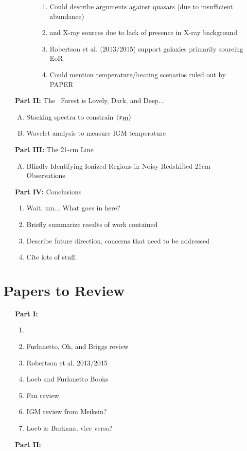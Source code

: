 \documentclass[11pt]{article}
\begin{document}
\begin{enumerate}
\begin{enumerate}[1.]
\begin{enumerate}[A.]
\begin{enumerate}[$\to$]
\item Could describe arguments against quasars (due to insufficient abundance) 
\item and X-ray sources due to lack of presence in X-ray background
\item Robertson et al. (2013/2015) support galaxies primarily sourcing EoR
\item Could mention temperature/heating scenarios ruled out by PAPER
\end{enumerate}
\end{enumerate}
\end{enumerate}




\item [{\bf Part II:}] The \lya\ Forest is Lovely, Dark, and Deep...
\begin{enumerate}[A.]
\item Stacking spectra to constrain $\langle x_{\text{HI}}\rangle$
\item Wavelet analysis to measure IGM temperature
\end{enumerate}
\item [{\bf Part III:}] The 21-cm Line
\begin{enumerate}[A.]
\item Blindly Identifying Ionized Regions in Noisy Redshifted 21cm Observations
\end{enumerate}
\item [{\bf Part IV:}] Conclusions
\begin{enumerate}[$\to$]
\item Wait, um... What goes in here?
\item Briefly summarize results of work contained 
\item Describe future direction, concerns that need to be addressed
\item Cite lots of stuff.
\end{enumerate}
\end{enumerate}






\section*{Papers to Review}
\begin{enumerate}
\item [{\bf Part I:}]
\begin{enumerate}[-]
\item 
\item Furlanetto, Oh, and Briggs review
\item Robertson et al. 2013/2015
\item Loeb and Furlanetto Books
\item Fan review
\item IGM review from Meiksin?
\item Loeb \& Barkana, vice versa?
\end{enumerate}
\item [{\bf Part II:}] 
\end{enumerate}
\end{document}
